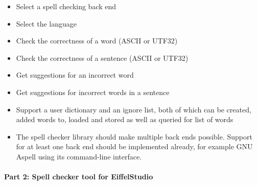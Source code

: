 \documentclass[paper=a4]{scrartcl}
\begin{document}
\begin{itemize}
\item Select a spell checking back end
\item Select the language
\item Check the correctness of a word (ASCII or UTF32)
\item Check the correctness of a sentence (ASCII or UTF32)
\item Get suggestions for an incorrect word
\item Get suggestions for incorrect words in a sentence
\item Support a user dictionary and an ignore list, both of which can be created, added words to, loaded and stored as well as queried for list of words
\item The spell checker library should make multiple back ends possible. Support for at least one back end should be implemented already, for example GNU Aspell using its command-line interface.
\end{itemize}

\paragraph{Part 2: Spell checker tool for EiffelStudio}
\end{document}
